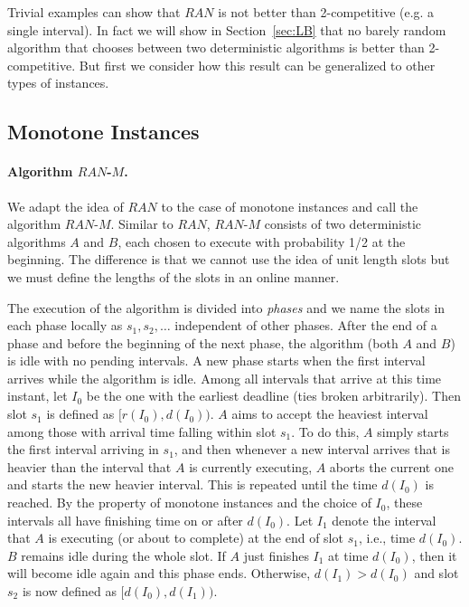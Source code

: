 \documentclass[11pt]{article}
\begin{document}
Trivial examples can show that $RAN$ is not better than 2-competitive
(e.g. a single interval).  In fact we will show in Section~\ref{sec:LB} 
that no barely random 
algorithm that chooses between two deterministic algorithms is better
than 2-competitive.
But first we consider how this result can be generalized to other
types of instances.

\subsection{Monotone Instances}

\paragraph{Algorithm $RAN$-$M$.} 
We adapt the idea of $RAN$ to the case of 
monotone instances and call the algorithm $RAN$-$M$.
Similar to $RAN$, $RAN$-$M$ consists of two deterministic algorithms $A$ 
and $B$, each chosen to execute with probability 1/2 at the beginning.
The difference is that we cannot use the idea of unit length slots
but we must define the lengths of the slots in an online manner.

The execution of the algorithm is divided into {\em phases}
and we name the slots in each phase locally as $s_1, s_2, \ldots$
independent of other phases.
After the end of a phase and before the beginning of the next phase,
the algorithm (both $A$ and $B$) is idle with no pending intervals.
A new phase starts when the first interval arrives while the algorithm is 
idle.
Among all intervals that arrive at this time instant, 
let $I_0$ be the one with the earliest deadline (ties broken arbitrarily).
Then slot $s_1$ is defined as $[r(I_0), d(I_0))$.
$A$ aims to accept the heaviest interval
among those with arrival time falling within slot $s_1$.
To do this, $A$ simply starts the first interval arriving in $s_1$, and
then whenever a new interval arrives that is heavier than the
interval that $A$ is currently executing,
$A$ aborts the current one and starts the new heavier interval.
This is repeated until the time $d(I_0)$ is reached.
By the property of monotone instances and 
the choice of $I_0$,
these intervals all have finishing time on or after $d(I_0)$.  
Let $I_1$ denote the interval that $A$ is executing (or about to complete)
at the end of slot $s_1$, i.e., time $d(I_0)$.  
$B$ remains idle during the whole slot.
If $A$ just finishes $I_1$ at time $d(I_0)$, then it will become idle again
and this phase ends.  
Otherwise, $d(I_1) > d(I_0)$ and 
slot $s_2$ is now defined as $[d(I_0), d(I_1))$.
\end{document}
